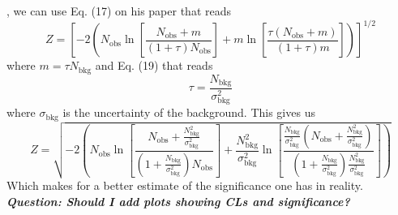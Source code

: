 \documentclass[12pt, a4paper]{book}
\begin{document}
\cite{Cowan_Uncertainty_in_sig}, we can use Eq. (17) on his paper that reads
$$
Z = \left[-2\left(N_{\text{obs}}\ln\left[\frac{N_{\text{obs}}+m}{(1+\tau)N_{\text{obs}}}\right] + m\ln\left[\frac{\tau(N_{\text{obs}}+m)}{(1+\tau)m}\right]\right)\right]^{1/2}
$$
where $m=\tau N_{\text{bkg}}$ and Eq. (19) that reads
$$
\tau=\frac{N_{\text{bkg}}}{\sigma_{\text{bkg}}^2}
$$
where $\sigma_{\text{bkg}}$ is the uncertainty of the background. This gives us
\begin{equation}\label{eq:significance}
    Z = \sqrt{-2\left(N_{\text{obs}}\ln\left[\frac{N_{\text{obs}}+\frac{N_{\text{bkg}}^2}{\sigma_{\text{bkg}}^2} }{(1+\frac{N_{\text{bkg}}}{\sigma_{\text{bkg}}^2})N_{\text{obs}}}\right] + \frac{N_{\text{bkg}}^2}{\sigma_{\text{bkg}}^2} \ln\left[\frac{\frac{N_{\text{bkg}}}{\sigma_{\text{bkg}}^2}(N_{\text{obs}}+\frac{N_{\text{bkg}}^2}{\sigma_{\text{bkg}}^2} )}{(1+\frac{N_{\text{bkg}}}{\sigma_{\text{bkg}}^2})\frac{N_{\text{bkg}}^2}{\sigma_{\text{bkg}}^2}}\right]\right)}
\end{equation}
Which makes for a better estimate of the significance one has in reality. \textit{\textbf{ Question: Should I add plots showing CLs and significance?}}\\

\clearpage
\end{document}
